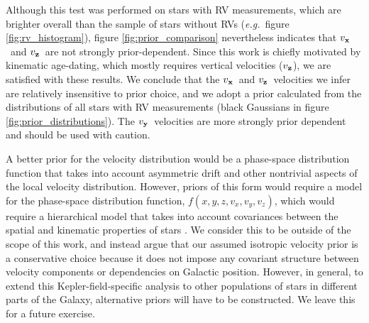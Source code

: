 \documentclass[]{aastex631}
\newcommand{\eg}{{\it e.g.}}
\newcommand{\vx}{$v_{\bf x}$}
\newcommand{\vy}{$v_{\bf y}$}
\newcommand{\vz}{$v_{\bf z}$}
\newcommand{\kms}{km s$^{-1}$}
\begin{document}
Although this test was performed on stars with RV measurements, which are
brighter overall than the sample of stars without RVs (\eg\ figure
\ref{fig:rv_histogram}), figure \ref{fig:prior_comparison} nevertheless
indicates that \vx\ and \vz\ are not strongly prior-dependent.
Since this work is chiefly motivated by kinematic age-dating, which mostly
requires vertical velocities (\vz), we are satisfied with these results.
We conclude that the \vx\ and \vz\ velocities we infer are relatively
insensitive to prior choice, and we adopt a prior calculated from the
distributions of all stars with RV measurements (black Gaussians in figure
\ref{fig:prior_distributions}).
The \vy\ velocities are more strongly prior dependent and should be used with
caution.

A better prior for the velocity distribution would be a phase-space
distribution function that takes into account asymmetric drift and other
nontrivial aspects of the local velocity distribution.
However, priors of this form would require a model for the phase-space
distribution function, $f(x,y,z,v_x,v_y,v_z)$, which would require a
hierarchical model that takes into account covariances between the spatial and
kinematic properties of stars \citep[\eg][]{trick2016, hagen2019,
anguiano2020}.
We consider this to be outside of the scope of this work, and instead argue
that our assumed isotropic velocity prior is a conservative choice because it
does not impose any covariant structure between velocity components or
dependencies on Galactic position.
However, in general, to extend this Kepler-field-specific analysis to other
populations of stars in different parts of the Galaxy, alternative priors will
have to be constructed.
We leave this for a future exercise.
\end{document}

